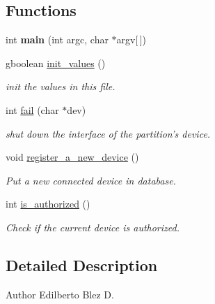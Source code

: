 \subsection*{Functions}
\begin{DoxyCompactItemize}
\item 
\hypertarget{usb-control_8c_a0ddf1224851353fc92bfbff6f499fa97}{
int {\bfseries main} (int argc, char $\ast$argv\mbox{[}$\,$\mbox{]})}
\label{usb-control_8c_a0ddf1224851353fc92bfbff6f499fa97}

\item 
gboolean \hyperlink{usb-control_8c_abc3e9b8557ead2451394660134b421f7}{init\_\-values} ()
\begin{DoxyCompactList}\small\item\em init the values in this file. \item\end{DoxyCompactList}\item 
int \hyperlink{usb-control_8c_ab9932ed1777b7d0acf1e366fdd73ef3e}{fail} (char $\ast$dev)
\begin{DoxyCompactList}\small\item\em shut down the interface of the partition's device. \item\end{DoxyCompactList}\item 
void \hyperlink{usb-control_8c_a10395957994d66e936a4cb1e68fe47aa}{register\_\-a\_\-new\_\-device} ()
\begin{DoxyCompactList}\small\item\em Put a new connected device in database. \item\end{DoxyCompactList}\item 
int \hyperlink{usb-control_8c_a07d78dafcde5f5109f5cebe323b1d401}{is\_\-authorized} ()
\begin{DoxyCompactList}\small\item\em Check if the current device is authorized. \item\end{DoxyCompactList}\end{DoxyCompactItemize}


\subsection{Detailed Description}
\begin{DoxyAuthor}{Author}
Edilberto Blez D. 
\end{DoxyAuthor}



